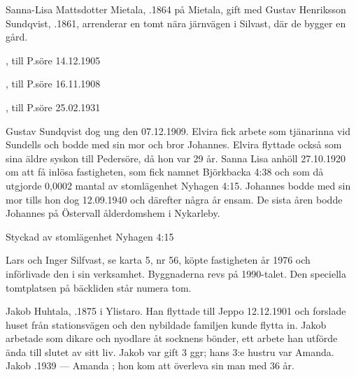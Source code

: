 %
Sanna-Lisa Mattsdotter Mietala, .1864 på Mietala, gift med Gustav Henriksson Sundqvist, .1861, arrenderar en tomt nära järnvägen i Silvast, där de bygger en gård.
\begin{jhchildren}
  \item {}
  \item {}, till P.söre 14.12.1905
  \item {}, till P.söre 16.11.1908
  \item {}
  \item {}, till P.söre 25.02.1931
\end{jhchildren}
Gustav Sundqvist dog ung den 07.12.1909. Elvira fick arbete som tjänarinna vid Sundells och bodde med sin mor	och bror Johannes. Elvira flyttade också som sina äldre syskon till Pedersöre, då hon var 29 år. Sanna Lisa anhöll 27.10.1920 om att få inlösa fastigheten, som fick namnet Björkbacka 4:38 och som då utgjorde 0,0002 mantal av stomlägenhet Nyhagen 4:15. Johannes bodde med sin mor tills hon dog 12.09.1940 och därefter några år ensam. De sista åren bodde Johannes på Östervall ålderdomshem i Nykarleby.



%

Styckad av stomlägenhet Nyhagen 4:15

%
Lars och Inger Silfvast, se karta 5, nr 56, köpte fastigheten år 1976 och införlivade den i sin verksamhet. Byggnaderna revs på 1990-talet. Den speciella tomtplatsen på bäckliden står numera tom.



%
Jakob Huhtala, .1875 i Ylistaro. Han flyttade till Jeppo 12.12.1901 och forslade huset från stationsvägen och den nybildade familjen kunde flytta in. Jakob  arbetade som dikare och nyodlare åt socknens bönder, ett arbete han utförde ända till slutet av sitt liv. Jakob var gift 3 ggr; hans 3:e hustru var Amanda.
Jakob .1939  ---  Amanda ; hon kom att överleva sin man med 36 år.

